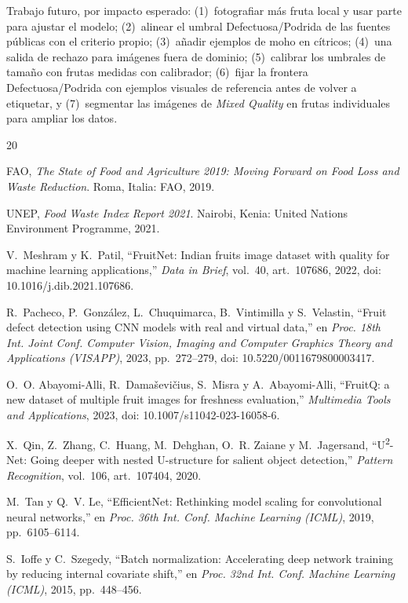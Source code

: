 \documentclass[conference,a4paper]{IEEEtran}
\begin{document}
Trabajo futuro, por impacto esperado: (1)~fotografiar más fruta local y usar parte para ajustar el
modelo; (2)~alinear el umbral Defectuosa/Podrida de las fuentes públicas con el criterio propio;
(3)~añadir ejemplos de moho en cítricos; (4)~una salida de rechazo para imágenes fuera de dominio;
(5)~calibrar los umbrales de tamaño con frutas medidas con calibrador; (6)~fijar la frontera
Defectuosa/Podrida con ejemplos visuales de referencia antes de volver a etiquetar, y (7)~segmentar las
imágenes de \emph{Mixed Quality} en frutas individuales para ampliar los datos.

\begin{thebibliography}{20}
\footnotesize

 FAO, \emph{The State of Food and Agriculture 2019: Moving Forward on Food Loss and Waste Reduction}. Roma, Italia: FAO, 2019.

 UNEP, \emph{Food Waste Index Report 2021}. Nairobi, Kenia: United Nations Environment Programme, 2021.

 V.~Meshram y K.~Patil, ``FruitNet: Indian fruits image dataset with quality for machine learning applications,'' \emph{Data in Brief}, vol.~40, art.~107686, 2022, doi: 10.1016/j.dib.2021.107686.

 R.~Pacheco, P.~González, L.~Chuquimarca, B.~Vintimilla y S.~Velastin, ``Fruit defect detection using CNN models with real and virtual data,'' en \emph{Proc. 18th Int. Joint Conf. Computer Vision, Imaging and Computer Graphics Theory and Applications (VISAPP)}, 2023, pp.~272--279, doi: 10.5220/0011679800003417.

 O.~O. Abayomi-Alli, R.~Damaševičius, S.~Misra y A.~Abayomi-Alli, ``FruitQ: a new dataset of multiple fruit images for freshness evaluation,'' \emph{Multimedia Tools and Applications}, 2023, doi: 10.1007/s11042-023-16058-6.

 X.~Qin, Z.~Zhang, C.~Huang, M.~Dehghan, O.~R. Zaiane y M.~Jagersand, ``U\textsuperscript{2}-Net: Going deeper with nested U-structure for salient object detection,'' \emph{Pattern Recognition}, vol.~106, art.~107404, 2020.

 M.~Tan y Q.~V. Le, ``EfficientNet: Rethinking model scaling for convolutional neural networks,'' en \emph{Proc. 36th Int. Conf. Machine Learning (ICML)}, 2019, pp.~6105--6114.

 S.~Ioffe y C.~Szegedy, ``Batch normalization: Accelerating deep network training by reducing internal covariate shift,'' en \emph{Proc. 32nd Int. Conf. Machine Learning (ICML)}, 2015, pp.~448--456.


\end{thebibliography}
\end{document}
